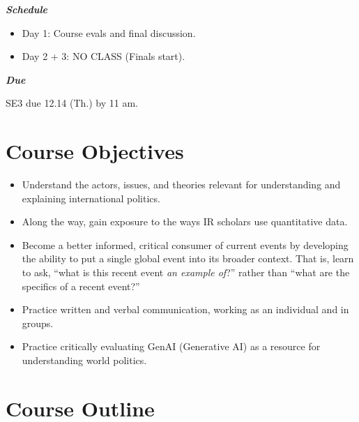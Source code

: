 \documentclass[11pt,]{article}
\providecommand{\tightlist}{%
  \setlength{\itemsep}{0pt}\setlength{\parskip}{0pt}}
\begin{document}
\begin{multicols}{2}

\textbf{\textit{Schedule}}

\begin{itemize} 

\item Day 1: Course evals and final discussion.

\item Day 2 + 3: NO CLASS (Finals start).

\end{itemize}

\begin{flushright}

\textbf{\textit{Due}}

SE3 due 12.14 (Th.) by 11 am.

\end{flushright}

\end{multicols}

\onehalfspacing

\setlength{\parskip}{5pt}

\clearpage

\hypertarget{course-objectives}{%
\section{Course Objectives}\label{course-objectives}}

\begin{itemize}
\tightlist
\item
  Understand the actors, issues, and theories relevant for understanding
  and explaining international politics.
\item
  Along the way, gain exposure to the ways IR scholars use quantitative
  data.
\item
  Become a better informed, critical consumer of current events by
  developing the ability to put a single global event into its broader
  context. That is, learn to ask, ``what is this recent event \emph{an
  example of}?'' rather than ``what are the specifics of a recent
  event?''
\item
  Practice written and verbal communication, working as an individual
  and in groups.
\item
  Practice critically evaluating GenAI (Generative AI) as a resource for
  understanding world politics.
\end{itemize}

\hypertarget{course-outline}{%
\section{Course Outline}\label{course-outline}}
\end{document}
